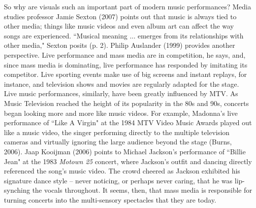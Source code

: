 
So why are visuals such an important part of modern music performances? Media studies professor Jamie Sexton (2007) points out that music is always tied to other media; things like music videos and even album art can affect the way songs are experienced. ``Musical meaning ... emerges from its relationships with other media," Sexton posits (p. 2). Philip Auslander (1999) provides another perspective. Live performance and mass media are in competition, he says, and, since mass media is dominating, live performance has responded by imitating its competitor. Live sporting events make use of big screens and instant replays, for instance, and television shows and movies are regularly adapted for the stage. Live music performances, similarly, have been greatly influenced by MTV. As Music Television reached the height of its popularity in the 80s and 90s, concerts began looking more and more like music videos. For example, Madonna's live performance of ``Like A Virgin" at the 1984 MTV Video Music Awards played out like a music video, the singer performing directly to the multiple television cameras and virtually ignoring the large audience beyond the stage (Burns, 2006). Jaap Kooijman (2006) points to Michael Jackson's performance of ``Billie Jean" at the 1983 \textit{Motown 25} concert, where Jackson's outfit and dancing directly referenced the song's music video. The crowd cheered as Jackson exhibited his signature dance style -- never noticing, or perhaps never caring, that he was lip-synching the vocals throughout. It seems, then, that mass media is responsible for turning concerts into the multi-sensory spectacles that they are today.
